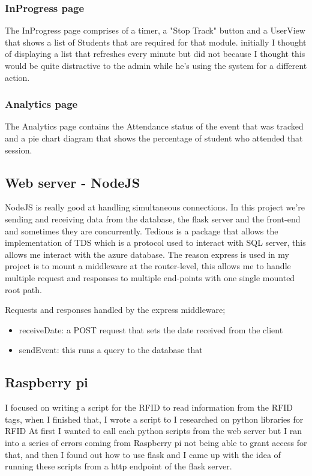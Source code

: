 \subsubsection{InProgress page}
The InProgress page comprises of a timer, a "Stop Track" button and a UserView that shows a list of Students that are required for that module. initially I thought of displaying a list that refreshes every minute but did not because I thought this would be quite distractive to the admin while he's using the system for a different action. 


\subsubsection{Analytics page}
The Analytics page contains the Attendance status of the event that was tracked and a pie chart diagram that shows the percentage of student who attended that session.





\subsection{Web server - NodeJS}
NodeJS is really good at handling simultaneous connections. In this project we're sending and receiving data from the database, the flask server and the front-end and sometimes they are concurrently. Tedious is a package that allows the implementation of TDS which is a protocol used to interact with SQL server, this allows me interact with the azure database.
The reason express is used in my project is to mount a middleware at the router-level, this allows me to handle multiple request and responses to multiple end-points with one single mounted root path. 

Requests and responses handled by the express middleware;
\begin{itemize}
    \item receiveDate: a POST request that sets the date received from the client
    \item sendEvent: this runs a query to the database that 
\end{itemize}

\subsection{Raspberry pi}
I focused on writing a script for the RFID to read information from the RFID tags, when I finished that, I wrote a script to 
I researched on python libraries for RFID
At first I wanted to call each python scripts from the web server but I ran into a series of errors coming from Raspberry pi not being able to grant access for that, and then I found out how to use flask and I came up with the idea of running these scripts from a http endpoint of the flask server.
